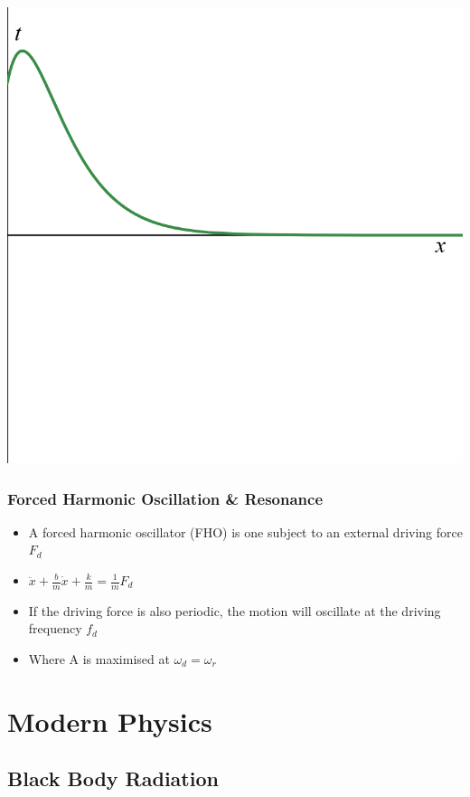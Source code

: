 \documentclass{article}
\begin{document}
\begin{itemize}
    \includegraphics[width=.5\linewidth]{year1/wfmp/periodic-motion/critically damped.png}

\end{itemize}

\subsubsection*{Forced Harmonic Oscillation \& Resonance}

\begin{itemize}
    \item A forced harmonic oscillator (FHO) is one subject to an external driving force \(F_d\)
    \item \(\ddot x + \frac{b}{m}\dot x + \frac{k}{m}=\frac{1}{m}F_d\)
    \item If the driving force is also periodic, the motion will oscillate at the driving frequency \(f_d\)
    \item Where A is maximised at \(\omega_d=\omega_r\)
\end{itemize}



\newpage
\section{Modern Physics}
\subsection{Black Body Radiation}

\end{document}
